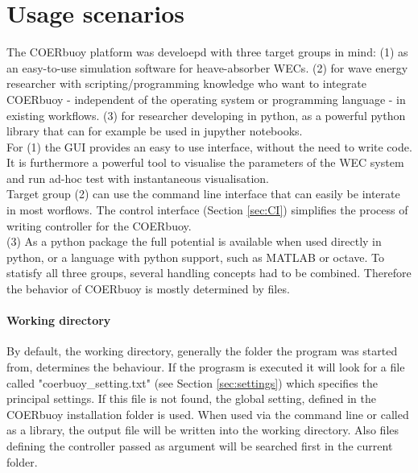 \documentclass[oneside,10pt,a4paper]{book}
\begin{document}
\section{Usage scenarios}
The COERbuoy platform was develoepd with three target groups in mind: (1) as an easy-to-use simulation software for heave-absorber WECs. (2) for wave energy researcher with scripting/programming knowledge who want to integrate COERbuoy - independent of the operating system or programming language - in existing workflows. (3) for researcher developing in python, as a powerful python library that can for example be used in jupyther notebooks.\\
For (1) the GUI provides an easy to use interface, without the need to write code. It is furthermore a powerful tool to visualise the parameters of the WEC system and run ad-hoc test with instantaneous visualisation.\\
Target group (2) can use the command line interface that can easily be interate in most worflows. The control interface (Section \ref{sec:CI}) simplifies the process of writing controller for the COERbuoy.\\
(3) As a python package the full potential is available when used directly in python, or a language with python support, such as MATLAB or octave.
To statisfy all three groups, several handling concepts had to be combined. Therefore the behavior of COERbuoy is mostly determined by files.
\paragraph{Working directory}
By default, the working directory, generally the folder the program was started from, determines the behaviour. If the prograsm is executed it will look for a file called "coerbuoy\_setting.txt" (see Section \ref{sec:settings}) which specifies the principal settings. If this file is not found, the global setting, defined in the COERbuoy installation folder is used.
When used via the command line or called as a library, the output file will be written into the working directory. Also files defining the controller passed as argument will be searched first in the current folder.\\
\end{document}
